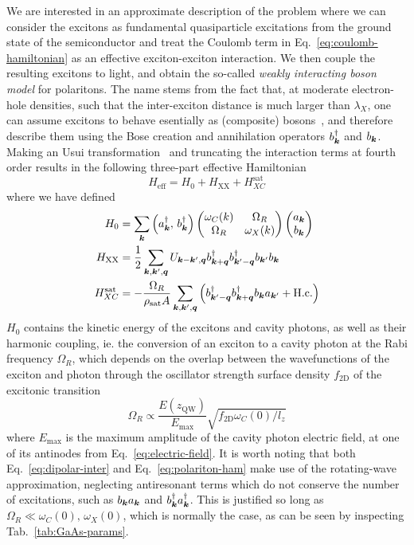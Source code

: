 We are interested in an approximate description of the problem where
we can consider the excitons as fundamental quasiparticle excitations
from the ground state of the semiconductor and treat the Coulomb term
in Eq.~\eqref{eq:coulomb-hamiltonian} as an effective exciton-exciton
interaction. We then couple the resulting excitons to light, and
obtain the so-called \textit{weakly interacting boson model} for
polaritons. The name stems from the fact that, at moderate
electron-hole densities, such that the inter-exciton distance is much
larger than $\lambda_X$, one can assume excitons to behave esentially
as (composite) bosons~\cite{deveaud2003electron}, and therefore
describe them using the Bose creation and annihilation operators
$b_{\bm{k}}^{\dagger}$ and $b_{\bm{k}}$. Making an Usui
transformation~\cite{Usui1960} and truncating the interaction terms at
fourth order results in the following three-part effective
Hamiltonian~\cite{Ciuti_2003}
%
\begin{equation}\label{eq:total-ham}
  H_{\text{eff}} = H_0  + H_{\text{XX}} + H_{XC}^{\text{sat}}
\end{equation}
% 
where we have defined
\begin{align}
  H_0 & =\sum_{\bm{k}}\left(a_{\bm{k}}^{\dagger},\, b_{\bm{k}}^{\dagger}\right)\begin{pmatrix} \omega_C(k) & \Omega_R\\ \Omega_R & \omega_X(k) \end{pmatrix}\begin{pmatrix} a_{\bm{k}}\\ b_{\bm{k}} \end{pmatrix}\label{eq:polariton-ham}\\
  H_{\text{XX}} & =\frac{1}{2}\sum_{\bm{k},\bm{k}^{\prime},\bm{q}}U_{\bm{k} - \bm{k}^{\prime},\bm{q}}b_{\bm{k} + \bm{q}}^{\dagger}b_{\bm{k}^{\prime} - \bm{q}}^{\dagger}b_{\bm{k}^{\prime}}b_{\bm{k}}\label{eq:interaction-ham}\\
  H_{XC}^{\text{sat}} & =-\frac{\Omega_R}{\rho_{\text{sat}}A}\sum_{\bm{k},\bm{k}^{\prime},\bm{q}}\left(b_{\bm{k}^{\prime}-\bm{q}}^{\dagger}b_{\bm{k} + \bm{q}}^{\dagger}b_{\bm{k}}a_{\bm{k}^{\prime}} + \text{H.c.}\right)\label{eq:saturation-ham}
\end{align}
$H_0$ contains the kinetic energy of the excitons and cavity photons,
as well as their harmonic coupling, ie. the conversion of an exciton
to a cavity photon at the Rabi frequency $\Omega_R$, which depends on
the overlap between the wavefunctions of the exciton and photon
through the  oscillator strength surface density $f_{\text{2D}}$ of
the excitonic transition
%
\begin{equation}\label{eq:omega-R}
  \Omega_R \propto \frac{E(z_{\text{QW}})}{E_{\text{max}}}\sqrt{f_{\text{2D}}\omega_C(0)/l_z}
\end{equation}
% 
where $E_{\text{max}}$ is the maximum amplitude of the cavity photon
electric field, at one of its antinodes from
Eq.~\eqref{eq:electric-field}. It is worth noting that both
Eq.~\eqref{eq:dipolar-inter} and Eq.~\eqref{eq:polariton-ham} make use
of the rotating-wave approximation, neglecting antiresonant terms
which do not conserve the number of excitations, such as
$b_{\bm{k}}a_{\bm{k}}$ and $b_{\bm{k}}^{\dagger}a_{\bm{k}}^{\dagger}$. This is
justified so long as $\Omega_R \ll \omega_C(0),\, \omega_X(0)$, which
is normally the case, as can be seen by inspecting
Tab.~\ref{tab:GaAs-params}.

